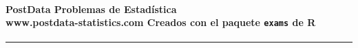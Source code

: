 \documentclass[10pt, a4paper]{article}
\makeatletter
\newcommand{\extext}[1]{\textbf{\large #1}}
\newcommand{\exnum}[9]{%
}
\newcommand{\myID}{\@ID}
\newcommand{\myDate}{\@Date}
\makeatother
\begin{document}
\thispagestyle{empty}
%
%
%
%
%


\paragraph{
PostData  
\hspace{6.4cm}
Problemas de Estadística
\\[2mm]
www.postdata-statistics.com
\hspace{1.5cm}
Creados con el paquete {\tt exams} de R}
\noindent\hrule




\begin{enumerate}



\end{enumerate}
\end{document}
